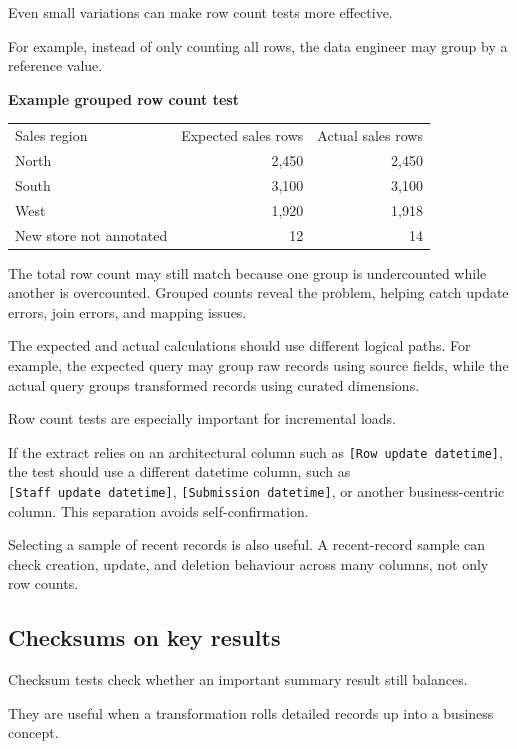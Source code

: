 \documentclass[10pt,openany,10pt]{book}
\newcounter{none}
\let\podeToprule\toprule
\let\podeMidrule\midrule
\let\podeBottomrule\bottomrule
\renewcommand{\toprule}{\arrayrulecolor{pbiGrid}\podeToprule}
\renewcommand{\midrule}{\arrayrulecolor{pbiGrid}\podeMidrule}
\renewcommand{\bottomrule}{\arrayrulecolor{pbiGrid}\podeBottomrule}
\begin{document}
Even small variations can make row count tests more effective.

For example, instead of only counting all rows, the data engineer may
group by a reference value.

\textbf{Example grouped row count test}

{\def\LTcaptype{none} %
\begin{longtable}[]{@{}lrr@{}}
\toprule\noalign{}
Sales region & Expected sales rows & Actual sales rows \\
\midrule\noalign{}
\endhead
\bottomrule\noalign{}
\endlastfoot
North & 2,450 & 2,450 \\
South & 3,100 & 3,100 \\
West & 1,920 & 1,918 \\
New store not annotated & 12 & 14 \\
\end{longtable}
}

The total row count may still match because one group is undercounted
while another is overcounted. Grouped counts reveal the problem, helping
catch update errors, join errors, and mapping issues.

The expected and actual calculations should use different logical paths.
For example, the expected query may group raw records using source
fields, while the actual query groups transformed records using curated
dimensions.

Row count tests are especially important for incremental loads.

If the extract relies on an architectural column such as
\texttt{{[}Row\ update\ datetime{]}}, the test should use a different
datetime column, such as \texttt{{[}Staff\ update\ datetime{]}},
\texttt{{[}Submission\ datetime{]}}, or another business-centric column.
This separation avoids self-confirmation.

Selecting a sample of recent records is also useful. A recent-record
sample can check creation, update, and deletion behaviour across many
columns, not only row counts.

\subsection{Checksums on key results}\label{checksums-on-key-results}

Checksum tests check whether an important summary result still balances.

They are useful when a transformation rolls detailed records up into a
business concept.
\end{document}
